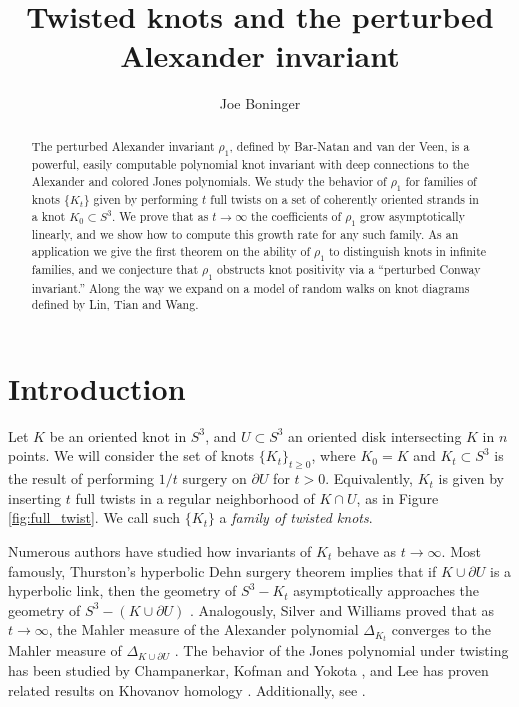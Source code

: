 \documentclass[11pt,hyp,]{nyjm}
\title{Twisted knots and the perturbed Alexander invariant}
\author{Joe Boninger}
\numberwithin{thm}{section}
\theoremstyle{definition}
\theoremstyle{remark}
\begin{document}
	
	\begin{abstract}
		The perturbed Alexander invariant $\rho_1$, defined by Bar-Natan and van der Veen, is a powerful, easily computable polynomial knot invariant with deep connections to the Alexander and colored Jones polynomials. We study the behavior of $\rho_1$ for families of knots $\{K_t\}$ given by performing $t$ full twists on a set of coherently oriented strands in a knot $K_0 \subset S^3$. We prove that as $t \to \infty$ the coefficients of $\rho_1$ grow asymptotically linearly, and we show how to compute this growth rate for any such family. As an application we give the first theorem on the ability of $\rho_1$ to distinguish knots in infinite families, and we conjecture that $\rho_1$ obstructs knot positivity via a ``perturbed Conway invariant.'' Along the way we expand on a model of random walks on knot diagrams defined by Lin, Tian and Wang.
	\end{abstract}

	\maketitle
	\tableofcontents
	
	\section{Introduction}
	
	Let $K$ be an oriented knot in $S^3$, and $U \subset S^3$ an oriented disk intersecting $K$ in $n$ points. We will consider the set of knots $\{K_t\}_{t \geq 0}$, where $K_0 = K$ and $K_t \subset S^3$ is the result of performing $1/t$ surgery on $\partial U$ for $t > 0$. Equivalently, $K_t$ is given by inserting $t$ full twists in a regular neighborhood of $K \cap U$, as in Figure \ref{fig:full_twist}. We call such $\{K_t\}$ a {\em family of twisted knots}.
	
	Numerous authors have studied how invariants of $K_t$ behave as $t \to \infty$. Most famously, Thurston's hyperbolic Dehn surgery theorem implies that if $K \cup \partial U$ is a hyperbolic link, then the geometry of $S^3 - K_t$ asymptotically approaches the geometry of $S^3 - (K \cup \partial U)$ \cite{thu22}. Analogously, Silver and Williams proved that as $t \to \infty$, the Mahler measure of the Alexander polynomial $\Delta_{K_t}$ converges to the Mahler measure of $\Delta_{K \cup \partial U}$ \cite{sw04}. The behavior of the Jones polynomial under twisting has been studied by Champanerkar, Kofman and Yokota \cite{ck05, yok91}, and Lee has proven related results on Khovanov homology \cite{lee23}. Additionally, see \cite{roz10, wil21, aza23, che22}.
	
\end{document}
